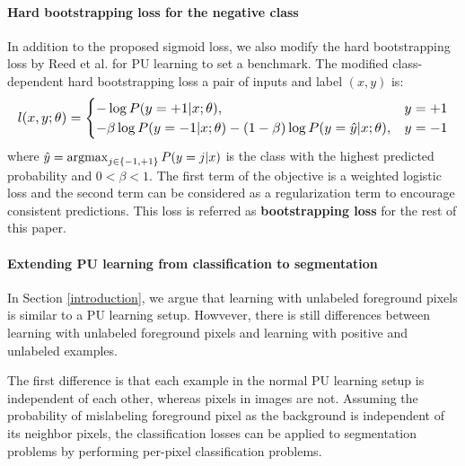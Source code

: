 \paragraph{Hard bootstrapping loss for the negative class}
In addition to the proposed sigmoid loss, we also modify the hard bootstrapping loss by Reed et al. \cite{reed2014training} for PU learning to set a benchmark.
The modified class-dependent hard bootstrapping loss a pair of inputs and label $(x,y)$ is:
\begin{equation*}
\resizebox{\columnwidth}{!}{$
  l(x, y; \theta) =
    \begin{cases}
      - \log P(y=+1 \vert x; \theta), & y = +1 \\
      - \beta \log P(y=-1 \vert x;\theta) - (1-\beta) \log P(y=\hat{y} \vert x;\theta), & y = -1
    \end{cases}
$}
\end{equation*}
where $\hat{y} = \operatorname*{argmax}_{j\in\{-1,+1\}}{P(y=j \vert x)}$ is the class with the highest predicted probability and $0<\beta<1$.
The first term of the objective is a weighted logistic loss and the second term can be considered as a regularization term to encourage consistent predictions.
This loss is referred as \textbf{bootstrapping loss} for the rest of this paper.

\paragraph{Extending PU learning from classification to segmentation}
In Section \ref{introduction}, we argue that learning with unlabeled foreground pixels is similar to a PU learning setup.
Howvever, there is still differences between learning with unlabeled foreground pixels and learning with positive and unlabeled examples.

The first difference is that each example in the normal PU learning setup is independent of each other, whereas pixels in images are not.
Assuming the probability of mislabeling foreground pixel as the background is independent of its neighbor pixels, the classification losses can be applied to segmentation problems by performing per-pixel classification problems.

